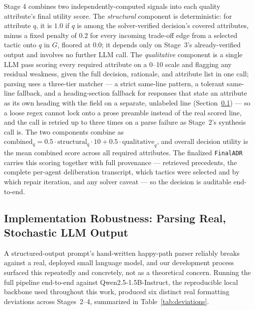 \documentclass[lettersize,journal]{IEEEtran}
\begin{document}
Stage 4 combines two independently-computed signals into each quality attribute's final utility score. The \emph{structural} component is deterministic: for attribute $q$, it is $1.0$ if $q$ is among the solver-verified decision's covered attributes, minus a fixed penalty of $0.2$ for every incoming trade-off edge from a selected tactic onto $q$ in $G$, floored at $0.0$; it depends only on Stage~3's already-verified output and involves no further LLM call. The \emph{qualitative} component is a single LLM pass scoring every required attribute on a 0--10 scale and flagging any residual weakness, given the full decision, rationale, and attribute list in one call; parsing uses a three-tier matcher --- a strict same-line pattern, a tolerant same-line fallback, and a heading-section fallback for responses that state an attribute as its own heading with the field on a separate, unlabeled line (Section~\ref{sec:method-robustness}) --- so a loose regex cannot lock onto a prose preamble instead of the real scored line, and the call is retried up to three times on a parse failure as Stage~2's synthesis call is. The two components combine as $\mathrm{combined}_q = 0.5 \cdot \mathrm{structural}_q \cdot 10 + 0.5 \cdot \mathrm{qualitative}_q$, and overall decision utility is the mean combined score across all required attributes. The finalized \texttt{FinalADR} carries this scoring together with full provenance --- retrieved precedents, the complete per-agent deliberation transcript, which tactics were selected and by which repair iteration, and any solver caveat --- so the decision is auditable end-to-end.

\subsection{Implementation Robustness: Parsing Real, Stochastic LLM Output}
\label{sec:method-robustness}

A structured-output prompt's hand-written happy-path parser reliably breaks against a real, deployed small language model, and our development process surfaced this repeatedly and concretely, not as a theoretical concern. Running the full pipeline end-to-end against Qwen2.5-1.5B-Instruct, the reproducible local backbone used throughout this work, produced six distinct real formatting deviations across Stages~2--4, summarized in Table~\ref{tab:deviations}.
\end{document}
